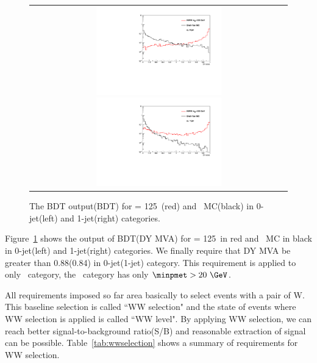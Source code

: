 \begin{figure}[htp] 
\centering
\begin{tabular}{c} 
\includegraphics[width=0.5\textwidth]{figures/dymva_0j.pdf} 
\includegraphics[width=0.5\textwidth]{figures/dymva_1j.pdf} 
\end{tabular} 
\caption{The BDT output(BDT) for \mHi = 125~\GeV(red) and \dyll\ MC(black)
in 0-jet(left) and 1-jet(right) categories.} 
\label{fig:dymva} 
\end{figure} 

Figure~\ref{fig:dymva} shows the output of BDT(DY MVA) for \mHi = 125~\GeV in red 
and \dyll\ MC in black in 0-jet(left) and 1-jet(right) categories. We finally require 
that DY MVA be greater than 0.88(0.84) in 0-jet(1-jet) category. This requirement 
is applied to only \SF\ category, the \DF\ category has only $\minpmet>20~\GeV$.

All requirements imposed so far area basically to select events with 
a pair of W. This baseline selection is called ``WW selection" and 
the state of events where WW selection is applied is called ``WW level".
By applying WW selection, we can reach better signal-to-background ratio(S/B)
and reasonable extraction of signal can be possible. 
Table~\ref{tab:wwselection} shows a summary of requirements for WW selection. 

